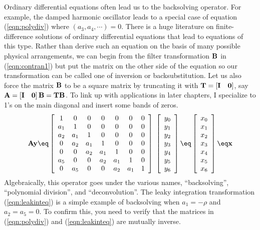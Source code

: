 \par
Ordinary differential equations often lead us to the backsolving operator.
For example, the damped harmonic oscillator leads to
a special case of equation
(\ref{eqn:polydiv})
where $(a_3,a_4,\cdots)=0$.
There is a huge literature on finite-difference solutions
of ordinary differential equations
that lead to equations of this type.
Rather than derive such an equation on the basis
of many possible physical arrangements,
we can begin from the filter transformation $\bold B$ in (\ref{eqn:contran1})
but put the matrix on the other side of the equation
so our transformation can be called one of inversion or backsubstitution.
Let us also force the matrix $\bold B$ to be a square matrix
by truncating it with
$\bold T = \left[ \bold I \quad \bold 0 \right]$, say
$\bold A =\left[ \bold I \quad \bold 0 \right] \bold B = \bold T \bold B$.
To link up with applications in later chapters,
I specialize to 1's on the main diagonal and insert some bands of zeros.
\begin{equation}
\bold A \bold y
\eq
\left[ 
\begin{array}{ccccccc}
   1  & 0   & 0    & 0   & 0   & 0   & 0  \\
  a_1 &  1  & 0    & 0   & 0   & 0   & 0  \\
  a_2 & a_1 &  1   & 0   & 0   & 0   & 0  \\
  0   & a_2 & a_1  &  1  & 0   & 0   & 0  \\
  0   & 0   & a_2  & a_1 &  1  & 0   & 0  \\
  a_5 & 0   & 0    & a_2 & a_1 &  1  & 0  \\
  0   & a_5 & 0    &   0 & a_2 & a_1 & 1
  \end{array} \right] 
\; \left[ 
\begin{array}{c}
  y_0 \\ 
  y_1 \\ 
  y_2 \\ 
  y_3 \\ 
  y_4 \\ 
  y_5 \\ 
  y_6
  \end{array} \right]
\eq
\left[ 
\begin{array}{c}
  x_0 \\ 
  x_1 \\ 
  x_2 \\ 
  x_3 \\ 
  x_4 \\ 
  x_5 \\ 
  x_6
  \end{array} \right] 
\eq
\bold x
\label{eqn:polydiv}
\end{equation}
Algebraically, this operator goes under the various names,
``backsolving'',
``polynomial division'', and
``deconvolution''.
The leaky integration transformation
(\ref{eqn:leakinteq})
is a simple example of backsolving
when $a_1=-\rho$ and $a_2=a_5=0$.
To confirm this, you need to verify that the matrices in
(\ref{eqn:polydiv})
and
(\ref{eqn:leakinteq})
are mutually inverse.

